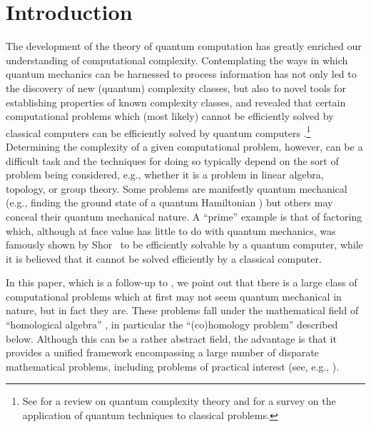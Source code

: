 \documentclass[11pt]{article}
\numberwithin{equation}{section}
\renewcommand\( {\left(}
\renewcommand\) {\right)}
\begin{document}

\setcounter{tocdepth}{2}
\tableofcontents
\newpage

%


\section{Introduction}

The development of the theory of quantum computation has greatly enriched our understanding of computational complexity. Contemplating the ways in which quantum mechanics can be harnessed to process information has not only led to the discovery of  new (quantum) complexity classes, but also to novel tools for establishing properties of known complexity classes, and revealed that certain computational problems which (most likely) cannot be efficiently solved by classical computers can be efficiently solved by quantum computers \cite{Shor_1997}.\footnote{See \cite{watrous2008quantum} for a review on quantum complexity theory and \cite{drucker2011quantum} for a survey on the application of quantum techniques to classical problems. } 
Determining the complexity of a given computational problem, however,  can be a difficult task and the techniques for doing so typically depend on the sort of problem being considered, e.g., whether it is a problem in linear algebra, topology, or group theory.
Some problems are manifestly quantum mechanical  (e.g., finding the ground state of a quantum Hamiltonian \cite{KitaevBook,2003quant.ph..2079K,2004quant.ph..6180K}) but others may conceal their quantum mechanical nature. A ``prime'' example is that of factoring which, although at face value has little to do with quantum mechanics,  was famously shown by Shor~\cite{Shor_1997} to be efficiently solvable by a quantum computer, while it is believed that it cannot be solved efficiently by a classical computer. 


In this paper, which is a follow-up to \cite{Crichigno:2020vue}, we point out that there is a large class of computational problems which at first may not seem  quantum mechanical in nature, but in fact they are.  These problems fall under the mathematical field of ``homological algebra'' \cite{weibel_1994,CartanEilenberg+2016}, in particular the ``(co)homology problem'' described below.  Although this can be a rather abstract field, the advantage is that it provides a unified framework encompassing a large number of disparate mathematical problems, including problems of practical interest (see, e.g.,  \cite{KaczynskiTomasz2004Ch/T}). 
\end{document}
